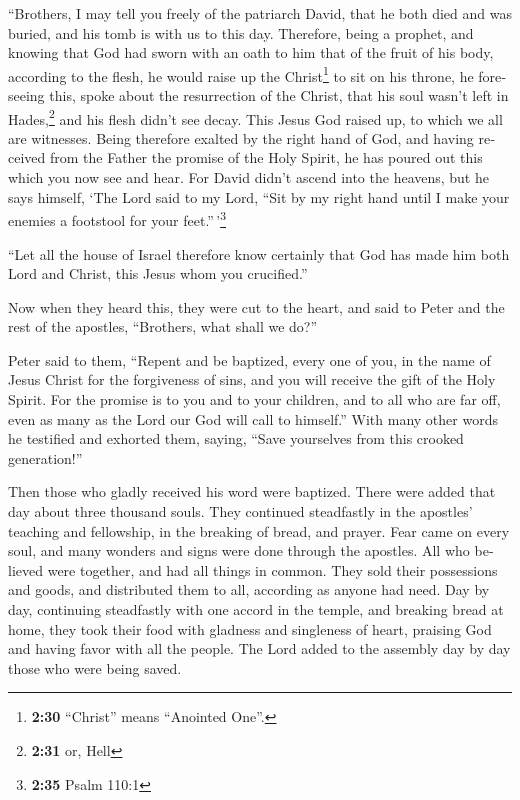 \begin{paracol}{2}
\begin{otherlanguage}{english}
 ``Brothers, I may tell you freely of the patriarch
David, that he both died and was buried, and his tomb is with us to this
day.  Therefore, being a prophet, and knowing that God
had sworn with an oath to him that of the fruit of his body, according
to the flesh, he would raise up the Christ\footnote{\textbf{2:30}
  ``Christ'' means ``Anointed One''.} to sit on his throne,
 he foreseeing this, spoke about the resurrection of the
Christ, that his soul wasn't left in Hades,\footnote{\textbf{2:31} or,
  Hell} and his flesh didn't see decay.  This Jesus God
raised up, to which we all are witnesses.  Being
therefore exalted by the right hand of God, and having received from the
Father the promise of the Holy Spirit, he has poured out this which you
now see and hear.  For David didn't ascend into the
heavens, but he says himself, `The Lord said to my Lord, ``Sit by my
right hand  until I make your enemies a footstool for
your feet.''\,'\footnote{\textbf{2:35} Psalm 110:1}

 ``Let all the house of Israel therefore know certainly
that God has made him both Lord and Christ, this Jesus whom you
crucified.''

 Now when they heard this, they were cut to the heart,
and said to Peter and the rest of the apostles, ``Brothers, what shall
we do?''

 Peter said to them, ``Repent and be baptized, every one
of you, in the name of Jesus Christ for the forgiveness of sins, and you
will receive the gift of the Holy Spirit.  For the
promise is to you and to your children, and to all who are far off, even
as many as the Lord our God will call to himself.''  With
many other words he testified and exhorted them, saying, ``Save
yourselves from this crooked generation!''

 Then those who gladly received his word were baptized.
There were added that day about three thousand souls. 
They continued steadfastly in the apostles' teaching and fellowship, in
the breaking of bread, and prayer.  Fear came on every
soul, and many wonders and signs were done through the apostles.
 All who believed were together, and had all things in
common.  They sold their possessions and goods, and
distributed them to all, according as anyone had need. 
Day by day, continuing steadfastly with one accord in the temple, and
breaking bread at home, they took their food with gladness and
singleness of heart,  praising God and having favor with
all the people. The Lord added to the assembly day by day those who were
being saved.


\end{otherlanguage}
\end{paracol}
